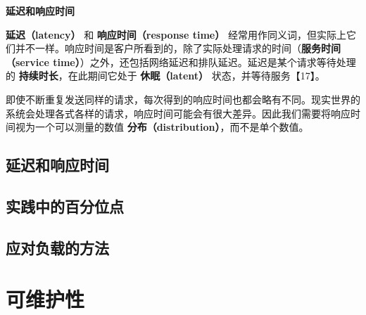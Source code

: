 \begin{mdframed}
  \textbf{延迟和响应时间}

  \textbf{延迟（latency）} 和 \textbf{响应时间（response time）} 经常用作同义词，但实际上它们并不一样。响应时间是客户所看到的，除了实际处理请求的时间（\textbf{服务时间（service time）}）之外，还包括网络延迟和排队延迟。延迟是某个请求等待处理的 \textbf{持续时长}，在此期间它处于 \textbf{休眠（latent）} 状态，并等待服务【17】。

\end{mdframed}

即使不断重复发送同样的请求，每次得到的响应时间也都会略有不同。现实世界的系统会处理各式各样的请求，响应时间可能会有很大差异。因此我们需要将响应时间视为一个可以测量的数值 \textbf{分布（distribution）}，而不是单个数值。

\subsection{延迟和响应时间}

\subsection{实践中的百分位点}

\subsection{应对负载的方法}
\label{sec:应对负载的方法}

\section{可维护性}

